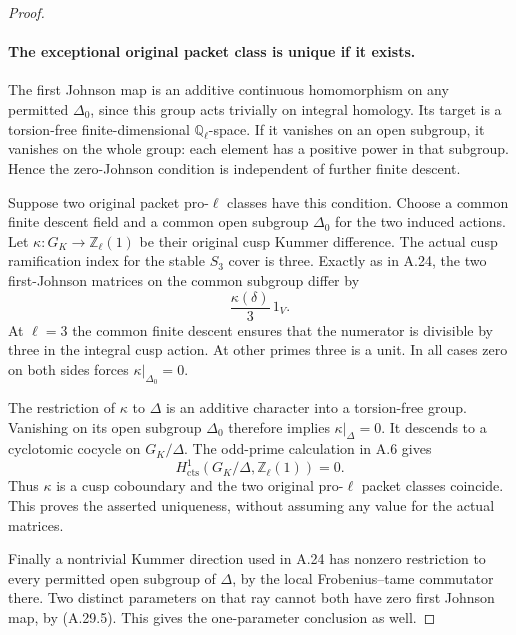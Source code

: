 \begin{proof}
\paragraph{The exceptional original packet class is unique if it exists.}
The first Johnson map is an additive continuous
homomorphism on any permitted $\Delta_0$, since
this group acts trivially on integral homology.
Its target is a torsion-free finite-dimensional
$\mathbb Q_\ell$-space. If it vanishes on an open
subgroup, it vanishes on the whole group:
each element has a positive power in that
subgroup. Hence the zero-Johnson condition is
independent of further finite descent.

Suppose two original packet pro-$\ell$ classes
have this condition. Choose a common finite
descent field and a common open subgroup
$\Delta_0$ for the two induced actions.
Let $\kappa:G_K\to\mathbb Z_\ell(1)$ be their
original cusp Kummer difference. The actual
cusp ramification index for the stable $S_3$
cover is three. Exactly as in A.24, the two
first-Johnson matrices on the common subgroup
differ by
\[
                        \frac{\kappa(\delta)}3\,1_V.
                                                        \tag{A.29.5}
\]
At $\ell=3$ the common finite descent ensures
that the numerator is divisible by three in
the integral cusp action. At other primes
three is a unit. In all cases zero on both
sides forces $\kappa|_{\Delta_0}=0$.

The restriction of $\kappa$ to $\Delta$ is an
additive character into a torsion-free group.
Vanishing on its open subgroup $\Delta_0$
therefore implies $\kappa|_\Delta=0$.
It descends to a cyclotomic cocycle on
$G_K/\Delta$. The odd-prime calculation in
A.6 gives
\[
              H^1_{\mathrm{cts}}
                 (G_K/\Delta,\mathbb Z_\ell(1))=0.
                                                        \tag{A.29.6}
\]
Thus $\kappa$ is a cusp coboundary and the
two original pro-$\ell$ packet classes coincide.
This proves the asserted uniqueness, without
assuming any value for the actual matrices.

Finally a nontrivial Kummer direction used
in A.24 has nonzero restriction to every
permitted open subgroup of $\Delta$, by
the local Frobenius--tame commutator there.
Two distinct parameters on that ray cannot
both have zero first Johnson map, by
(A.29.5). This gives the one-parameter
conclusion as well.
\end{proof}

